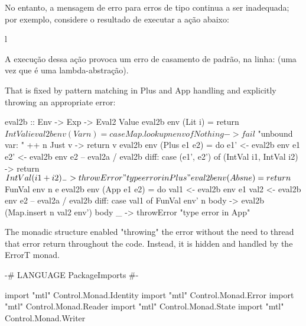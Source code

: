 No entanto, a mensagem de erro para erros de tipo continua a ser
inadequada; por exemplo, considere o resultado de executar a
ação  abaixo:

\begin{center}
\begin{tabular}{l}
\end{tabular}
\end{center}

A execução dessa ação provoca um erro de casamento de padrão, na
linha:  (uma vez que  é uma
lambda-abstração).

That is fixed by pattern matching in Plus and App handling and explicitly throwing an appropriate error:

eval2b                 :: Env -> Exp -> Eval2 Value
eval2b env (Lit  i)     = return $ IntVal i
eval2b env (Var  n)     = case Map.lookup n env of
                              Nothing -> fail $ "unbound var: " ++ n
                              Just v  -> return v
eval2b env (Plus e1 e2) = do  e1'  <- eval2b env e1
                              e2'  <- eval2b env e2
                              -- eval2a / eval2b diff:
                              case (e1', e2') of
                                  (IntVal i1, IntVal i2) -> return $ IntVal (i1 + i2)
                                  _                      -> throwError "type error in Plus"
eval2b env (Abs  n  e)  = return $ FunVal env n e
eval2b env (App  e1 e2) = do  val1  <- eval2b env e1
                              val2  <- eval2b env e2
                              -- eval2a / eval2b diff:
                              case val1 of
                                  FunVal env' n body -> eval2b (Map.insert n val2 env') body
                                  _                  -> throwError "type error in App"

The monadic structure enabled "throwing" the error without the need to thread that error return throughout the code. Instead, it is hidden and handled by the ErrorT monad.

{-# LANGUAGE PackageImports #-}

import           "mtl" Control.Monad.Identity
import           "mtl" Control.Monad.Error
import           "mtl" Control.Monad.Reader
import           "mtl" Control.Monad.State
import           "mtl" Control.Monad.Writer

